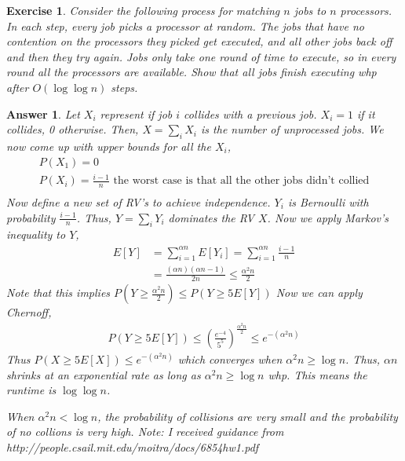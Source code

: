 \documentclass[12pt]{article}
\theoremstyle{colon}
\newtheorem{exercise}{Exercise}
\newtheorem*{answer}{Answer}
\begin{document}
\clearpage

\begin{exercise}
  Consider the following process for matching $n$ jobs to $n$ processors. In each step, every job picks a processor at random. The jobs that have no contention on the processors they picked get executed, and all other jobs \textit{back off} and then they try again. Jobs only take one round of time to execute, so in every round all the processors are available. Show that all jobs finish executing whp after $O(\log \log n)$ steps.
\end{exercise}

\begin{answer}
  Let $X_i$ represent if job $i$ collides with a previous job. $X_i = 1$ if it collides, 0 otherwise.
  Then, $X = \sum_i X_i$ is the number of unprocessed jobs.
  We now come up with upper bounds for all the $X_i$,
  \begin{gather*}
    P(X_1) = 0 \\
    P(X_i) = \frac{i-1}{n} \text{ the worst case is that all the other jobs didn't collied} \\
  \end{gather*}
  Now define a new set of RV's to achieve independence. $Y_i$ is Bernoulli with probability $\frac{i-1}{n}$. Thus, $Y = \sum_i Y_i$ dominates the RV $X$. Now we apply Markov's inequality to $Y$,
  \begin{align*}
    E[Y] &= \sum\limits_{i = 1}^{\alpha n} E[Y_i] = \sum\limits_{i = 1}^{\alpha n} \frac{i-1}{n} \\
    &= \frac{(\alpha n)(\alpha n -1)}{2n} \leq \frac{\alpha^2 n}{2}
  \end{align*}
  Note that this implies $P(Y \geq \frac{\alpha^2 n}{2}) \leq P(Y \geq 5E[Y])$
  Now we can apply Chernoff,
  \begin{gather*}
    P(Y \geq 5E[Y]) \leq \left( \frac{e^{-4}}{5^5} \right)^{\frac{\alpha^2 n}{2}} \leq e^{-(\alpha^2 n)}
  \end{gather*}
  Thus $P(X \geq 5E[X]) \leq e^{-(\alpha^2 n)}$ which converges when $\alpha^2 n \geq \log n$. Thus, $\alpha n$ shrinks at an exponential rate as long as $\alpha^2 n \geq \log n$ whp. This means the runtime is $\log \log n$.

  When $\alpha^2 n < \log n$, the probability of collisions are very small and the probability of no collions is very high.
  Note: I received guidance from http://people.csail.mit.edu/moitra/docs/6854hw1.pdf
\end{answer}
\end{document}
